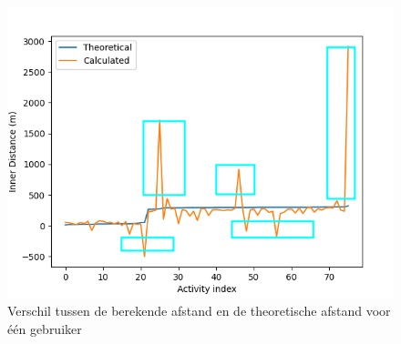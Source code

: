 \begin{figure}
    \centering
    \includegraphics[width=\textwidth]{fig/Afwijkingen&Analyses/Graphs/Verschil_Theoretische_innerDistance.png}
    \caption{Verschil tussen de berekende afstand en de theoretische afstand voor één gebruiker}\label{fig:difference_noCDF}
\end{figure}
